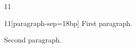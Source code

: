 \documentclass[paper=A4]{ropas-poster}
\begin{document}
\begin{postergrid}{1}{1}
\begin{posterblock}{1}{1}[paragraph-sep=18bp]
First paragraph.

Second paragraph.
\end{posterblock}
\end{postergrid}
\end{document}
